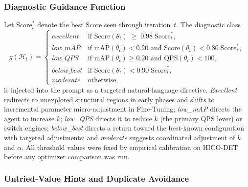 \documentclass[sigconf, nonacm]{acmart}
\theoremstyle{definition}
\begin{document}
\subsubsection{Diagnostic Guidance Function}
\label{sec:guidance}

Let $\mathrm{Score}^*_{t}$ denote the best Score seen through iteration~$t$.
The diagnostic class
{\footnotesize%
\begin{equation}
  g(\mathcal{H}_{t}) =
  \begin{cases}
    \textit{excellent}   & \text{if } \mathrm{Score}(\theta_{t})
                           \;\geq\; 0.98\;\mathrm{Score}^*_{t},\\[2pt]
    \textit{low\_mAP}    & \text{if } \mathrm{mAP}(\theta_{t}) < 0.20
                           \text{ and } \mathrm{Score}(\theta_{t})
                           < 0.80\;\mathrm{Score}^*_{t},\\[2pt]
    \textit{low\_QPS}    & \text{if } \mathrm{mAP}(\theta_{t}) \geq 0.20
                           \text{ and } \mathrm{QPS}(\theta_{t}) < 100,\\[2pt]
    \textit{below\_best} & \text{if } \mathrm{Score}(\theta_{t})
                           < 0.90\;\mathrm{Score}^*_{t},\\[2pt]
    \textit{moderate}    & \text{otherwise,}
  \end{cases}
  \label{eq:guidance}
\end{equation}%
}
is injected into the prompt as a targeted natural-language directive.
\textit{Excellent} redirects to unexplored structural regions in early phases and
shifts to incremental parameter micro-adjustment in Fine-Tuning;
\textit{low\_mAP} directs the agent to increase $k$;
\textit{low\_QPS} directs it to reduce $k$ (the primary QPS lever) or switch engines;
\textit{below\_best} directs a return toward the best-known configuration with targeted adjustments;
and \textit{moderate} suggests coordinated adjustment of $k$ and $\alpha$.
All threshold values were fixed by empirical calibration on HICO-DET before any optimizer comparison was run.
\subsubsection{Untried-Value Hints and Duplicate Avoidance}
\label{sec:hints}
\end{document}
